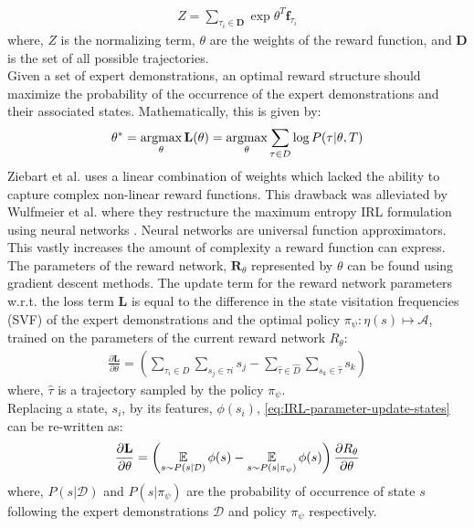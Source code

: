 \begin{align}
Z = \sum_{\tau_{i}\in \mathbf{D}}\exp{\theta^{T}\mathbf{f}_{\tau_{i}}}
\end{align}
where, $Z$ is the normalizing term, $\theta$ are the weights of the reward function, and $\mathbf{D}$ is the set of all possible trajectories.\\
Given a set of expert demonstrations, an optimal reward structure should maximize the probability of the occurrence of the expert demonstrations and their associated states. Mathematically, this is given by: 
\begin{align}
\label{eq:loglikelihood-IRL}
\theta^{*} = \operatorname*{argmax}_{\theta} \mathbf{L}(\theta) = \operatorname*{argmax}_{\theta} \sum_{\tau \in D} \log{P(\tau| \theta, T)}
\end{align}
Ziebart et al. \cite{ziebart_maxent_2008} uses a linear combination of weights which lacked the ability to capture complex non-linear reward functions. This drawback was alleviated by Wulfmeier et al. where they restructure the maximum entropy IRL formulation using neural networks \cite{wulfmeier2015maximum}. Neural networks are universal function approximators. This vastly increases the amount of complexity a reward function can express.\\
The parameters of the reward network, $\mathbf{R}_{\theta}$ represented by $\theta$ can be found using gradient descent methods. The  update term for the reward network parameters w.r.t. the loss term $\mathbf{L}$ is equal to the difference in the state visitation frequencies (SVF) of the expert demonstrations and the optimal policy $\pi_{\psi} : \eta(s) \mapsto \mathcal{A} $, trained on the parameters of the current reward network $R_{\theta}$:
\begin{align}
	\label{eq:IRL-parameter-update-states}
	\frac{\partial \mathbf{L}}{\partial \theta} = \left(\sum_{\tau_{i} \in D}\sum_{s_{j} \in \tau{i}}s_{j} - \sum_{\hat{\tau} \in \hat{D}}\sum_{s_{k} \in \hat{\tau}}s_{k}\right)
\end{align}
where, $\hat{\tau}$ is a trajectory sampled by the policy $\pi_{\psi}$.\\
Replacing a state, $s_{i}$, by its features, $\phi(s_{i})$, \autoref{eq:IRL-parameter-update-states} can be re-written as:
\begin{align}
	\label{eq:IRL-parameter-update-features}
	\frac{\partial \mathbf{L}}{\partial \theta} = \left(\operatorname*{\mathbb{E}}_{s \sim P(s|\mathcal{D})} \phi(s) - \operatorname*{\mathbb{E}}_{s \sim P(s|\pi_\psi)} \phi(s)\right) \frac{\partial R_\theta}{\partial \theta} 
\end{align}
where, $P(s|\mathcal{D})$ and $P(s|\pi_{\psi})$ are the probability of occurrence of state $s$ following the expert demonstrations $\mathcal{D}$ and policy $\pi_{\psi}$ respectively.

